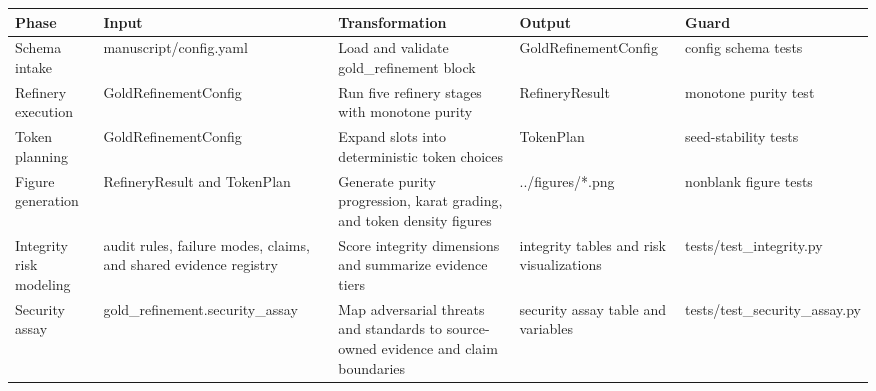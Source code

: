 \documentclass[
  english,
]{article}
\newcounter{none} %
\begin{document}
{\def\LTcaptype{none} %
\begin{longtable}[]{@{}
  >{\raggedright\arraybackslash}p{}
  >{\raggedright\arraybackslash}p{}
  >{\raggedright\arraybackslash}p{}
  >{\raggedright\arraybackslash}p{}
  >{\raggedright\arraybackslash}p{}@{}}
\toprule\noalign{}
\begin{minipage}[b]{\linewidth}\raggedright
Phase
\end{minipage} & \begin{minipage}[b]{\linewidth}\raggedright
Input
\end{minipage} & \begin{minipage}[b]{\linewidth}\raggedright
Transformation
\end{minipage} & \begin{minipage}[b]{\linewidth}\raggedright
Output
\end{minipage} & \begin{minipage}[b]{\linewidth}\raggedright
Guard
\end{minipage} \\
\midrule\noalign{}
\endhead
\bottomrule\noalign{}
\endlastfoot
Schema intake & manuscript/config.yaml & Load and validate
gold\_refinement block & GoldRefinementConfig & config schema tests \\
Refinery execution & GoldRefinementConfig & Run five refinery stages
with monotone purity & RefineryResult & monotone purity test \\
Token planning & GoldRefinementConfig & Expand slots into deterministic
token choices & TokenPlan & seed-stability tests \\
Figure generation & RefineryResult and TokenPlan & Generate purity
progression, karat grading, and token density figures & ../figures/*.png
& nonblank figure tests \\
Integrity risk modeling & audit rules, failure modes, claims, and shared
evidence registry & Score integrity dimensions and summarize evidence
tiers & integrity tables and risk visualizations &
tests/test\_integrity.py \\
Security assay & gold\_refinement.security\_assay & Map adversarial
threats and standards to source-owned evidence and claim boundaries &
security assay table and variables & tests/test\_security\_assay.py \\

\end{longtable}}
\end{document}

